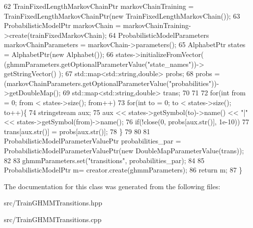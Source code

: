\begin{DoxyCode}
62     TrainFixedLengthMarkovChainPtr markovChainTraining = TrainFixedLengthMarkovChainPtr(\textcolor{keyword}{new} 
      TrainFixedLengthMarkovChain());
63     ProbabilisticModelPtr markovChain  = markovChainTraining->create(trainFixedMarkovChain);
64     ProbabilisticModelParameters markovChainParameters = markovChain->parameters();
65     AlphabetPtr states = AlphabetPtr(\textcolor{keyword}{new} Alphabet());
66     states->initializeFromVector( (ghmmParameters.getOptionalParameterValue(\textcolor{stringliteral}{"state\_names"}))->
      getStringVector() );
67     std::map<std::string,double> probs;
68     probs = (markovChainParameters.getOptionalParameterValue(\textcolor{stringliteral}{"probabilities"}))->getDoubleMap();
69     std::map<std::string,double> trans;
70 
71 
72     \textcolor{keywordflow}{for}(\textcolor{keywordtype}{int} from = 0; from < states->size(); from++)
73       \textcolor{keywordflow}{for}(\textcolor{keywordtype}{int} to = 0; to < states->size(); to++)\{
74     stringstream aux;
75     aux << states->getSymbol(to)->name() << \textcolor{stringliteral}{"|"} << states->getSymbol(from)->name();
76     \textcolor{keywordflow}{if}(!close(0, probs[aux.str()], 1e-10)) 
77       trans[aux.str()] = probs[aux.str()];
78       \}
79 
80     
81     ProbabilisticModelParameterValuePtr probabilities\_par = ProbabilisticModelParameterValuePtr(\textcolor{keyword}{new} 
      DoubleMapParameterValue(trans)); 
82 
83     ghmmParameters.set(\textcolor{stringliteral}{"transitions"}, probabilities\_par);
84 
85     ProbabilisticModelPtr m= creator.create(ghmmParameters);
86     \textcolor{keywordflow}{return} m;
87   \}
\end{DoxyCode}


The documentation for this class was generated from the following files\+:\begin{DoxyCompactItemize}
\item 
src/Train\+G\+H\+M\+M\+Transitions.\+hpp\item 
src/Train\+G\+H\+M\+M\+Transitions.\+cpp\end{DoxyCompactItemize}
